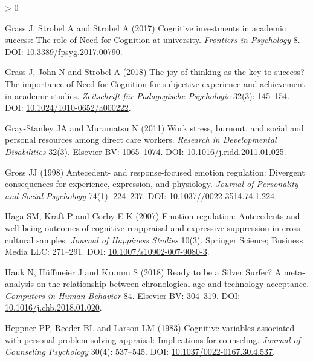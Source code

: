 \documentclass[
  english,
  man,floatsintext]{apa6}
\newlength{\cslhangindent}
\newenvironment{CSLReferences}[2] %
 {%
  \setlength{\parindent}{0pt}
  \ifodd #1 \everypar{\setlength{\hangindent}{\cslhangindent}}\ignorespaces\fi
  \ifnum #2 > 0
  \setlength{\parskip}{#2\baselineskip}
  \fi
 }%
 {}
\begin{document}
\begin{CSLReferences}{1}{0}
\leavevmode\hypertarget{ref-Grass2017}{}%
Grass J, Strobel A and Strobel A (2017) Cognitive investments in academic success: {The} role of {Need} for {Cognition} at university. \emph{Frontiers in Psychology} 8. DOI: \href{https://doi.org/10.3389/fpsyg.2017.00790}{10.3389/fpsyg.2017.00790}.

\leavevmode\hypertarget{ref-Grass2018}{}%
Grass J, John N and Strobel A (2018) The joy of thinking as the key to success? {The} importance of {Need} for {Cognition} for subjective experience and achievement in academic studies. \emph{Zeitschrift für Padagogische Psychologie} 32(3): 145--154. DOI: \href{https://doi.org/10.1024/1010-0652/a000222}{10.1024/1010-0652/a000222}.

\leavevmode\hypertarget{ref-GrayStanley2011}{}%
Gray-Stanley JA and Muramatsu N (2011) Work stress, burnout, and social and personal resources among direct care workers. \emph{Research in Developmental Disabilities} 32(3). Elsevier {BV}: 1065--1074. DOI: \href{https://doi.org/10.1016/j.ridd.2011.01.025}{10.1016/j.ridd.2011.01.025}.

\leavevmode\hypertarget{ref-Gross1998a}{}%
Gross JJ (1998) Antecedent- and response-focused emotion regulation: {Divergent} consequences for experience, expression, and physiology. \emph{Journal of Personality and Social Psychology} 74(1): 224--237. DOI: \href{https://doi.org/10.1037//0022-3514.74.1.224}{10.1037//0022-3514.74.1.224}.

\leavevmode\hypertarget{ref-Haga2007}{}%
Haga SM, Kraft P and Corby E-K (2007) Emotion regulation: Antecedents and well-being outcomes of cognitive reappraisal and expressive suppression in cross-cultural samples. \emph{Journal of Happiness Studies} 10(3). Springer Science; Business Media {LLC}: 271--291. DOI: \href{https://doi.org/10.1007/s10902-007-9080-3}{10.1007/s10902-007-9080-3}.

\leavevmode\hypertarget{ref-Hauk2018}{}%
Hauk N, Hüffmeier J and Krumm S (2018) Ready to be a {Silver Surfer}? {A} meta-analysis on the relationship between chronological age and technology acceptance. \emph{Computers in Human Behavior} 84. Elsevier {BV}: 304--319. DOI: \href{https://doi.org/10.1016/j.chb.2018.01.020}{10.1016/j.chb.2018.01.020}.

\leavevmode\hypertarget{ref-Heppner1983}{}%
Heppner PP, Reeder BL and Larson LM (1983) Cognitive variables associated with personal problem-solving appraisal: {Implications} for counseling. \emph{Journal of Counseling Psychology} 30(4): 537--545. DOI: \href{https://doi.org/10.1037/0022-0167.30.4.537}{10.1037/0022-0167.30.4.537}.


\end{CSLReferences}
\end{document}
